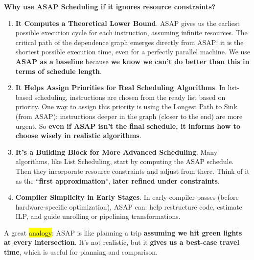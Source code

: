\highspace
\begin{flushleft}
    \textcolor{Green3}{ \textbf{Why use ASAP Scheduling if it ignores resource constraints?}}
\end{flushleft}
\begin{enumerate}
    \item \textbf{It Computes a Theoretical Lower Bound}. ASAP gives us the earliest possible execution cycle for each instruction, assuming infinite resources. The critical path of the dependence graph emerges directly from ASAP: it is the shortest possible execution time, even for a perfectly parallel machine. We use \textbf{ASAP as a baseline} because \textbf{we know we can't do better than this in terms of schedule length}.

    \item \textbf{It Helps Assign Priorities for Real Scheduling Algorithms}. In list-based scheduling, instructions are chosen from the ready list based on priority. One way to assign this priority is using the Longest Path to Sink (from ASAP): instructions deeper in the graph (closer to the end) are more urgent. So \textbf{even if ASAP isn't the final schedule, it informs how to choose wisely in realistic algorithms}.
    
    \item \textbf{It's a Building Block for More Advanced Scheduling}. Many algorithms, like List Scheduling, start by computing the ASAP schedule. Then they incorporate resource constraints and adjust from there. Think of it as the ``\textbf{first approximation}'', \textbf{later refined under constraints}.
    
    \item \textbf{Compiler Simplicity in Early Stages}. In early compiler passes (before hardware-specific optimization), ASAP can: help restructure code, estimate ILP, and guide unrolling or pipelining transformations.
\end{enumerate}
A great \hl{analogy}: ASAP is like planning a trip \textbf{assuming we hit green lights at every intersection}. It's not realistic, but it \textbf{gives us a best-case travel time}, which is useful for planning and comparison.

